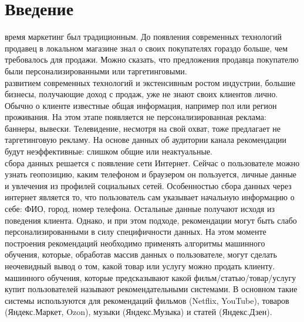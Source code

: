 \documentclass{article}
\newcommand\tab[1][1cm]{\hspace*{#1}}
\begin{document}
\newpage
	
\renewcommand*\contentsname{Содержание}
\makeatletter
\renewcommand{\l@section}{\@dottedtocline{1}{0em}{2em}}
\renewcommand{\l@subsection}{\@dottedtocline{1}{0em}{2.6em}}
\renewcommand{\l@subsubsection}{\@dottedtocline{1}{0em}{3.2em}}

\makeatother
\setcounter{page}{2}

\begin{center}
	\tableofcontents
\end{center}

\newpage
{}
\section*{Введение}
 время маркетинг был традиционным. До появления современных технологий продавец в локальном магазине знал о своих покупателях гораздо больше, чем требовалось для продажи. Можно сказать, что предложения продавца покупателю были персонализированными или таргетинговыми. \\
 развитием современных технологий и экстенсивным ростом индустрии, большие бизнесы, получающие доход с продаж, уже не знают своих клиентов лично. Обычно о клиенте известные общая информация, например пол или регион проживания. На этом этапе появляется не персонализированная реклама: баннеры, вывески. Телевидение, несмотря на свой охват, тоже предлагает не таргетинговую рекламу. На основе данных об аудитории канала рекомендации будут неэффективные: слишком общие или неактуальные. \\
 сбора данных решается с появление сети Интернет. Сейчас о пользователе можно узнать геопозицию, каким телефоном и браузером он пользуется, личные данные и увлечения из профилей социальных сетей. Особенностью сбора данных через интернет является то, что пользователь сам указывает начальную информацию о себе: ФИО, город, номер телефона. Остальные данные получают исходя из поведения клиента. 
Однако, и при этом подходе, рекомендации могут быть слабо персонализированными в силу специфичности данных. На этом моменте построения рекомендаций необходимо применять алгоритмы машинного обучения, которые, обработав массив данных о пользователе, могут сделать неочевидный вывод о том, какой товар или услугу можно продать клиенту.\\
 машинного обучения, которые предсказывают какой фильм/статью/товар/услугу купит пользователей называют рекомендательными системами. В основном такие системы используются для рекомендаций фильмов (Netflix, YouTube), товаров (Яндекс.Маркет, Ozon), музыки (Яндекс.Музыка) и статей (Яндекс.Дзен). \\
\end{document}
